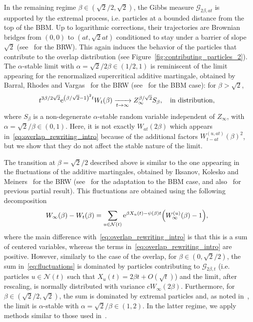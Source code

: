 \documentclass[AHL,Unicode,longabstracts,published]{cedram}
\newcommand{\e}{\mathrm{e}}
\newcommand\1{\mathds{1}}
\newcommand{\cG}{\mathcal{G}}
\newcommand{\cN}{\mathcal{N}}
\let\originalleft\left
\let\originalright\right
\renewcommand{\left}{\mathopen{}\mathclose\bgroup\originalleft}
\renewcommand{\right}{\aftergroup\egroup\originalright}
\renewcommand*{\to}{\mathchoice{\longrightarrow}{\rightarrow}{\rightarrow}{\rightarrow}}
\begin{document}
In the remaining regime $\beta \in (\sqrt{2}/2, \sqrt{2})$, the Gibbs measure $\cG_{2\beta, at}$ is supported by the extremal process, i.e. particles at a bounded distance from the top of the BBM. Up to logarithmic corrections, their trajectories are Brownian bridges from $(0,0)$ to $(at,\sqrt{2}at)$ conditioned to stay under a barrier of slope $\sqrt{2}$ (see~\cite{ChenMadauleMallein2019} for the BRW). This again induces the behavior of the particles that contribute to the overlap distribution (see Figure~\ref{fig:contributing_particles_2}). The $\alpha$-stable limit with $\alpha = \sqrt{2}/2\beta \in (1/2, 1)$ is reminiscent of the limit appearing for the renormalized supercritical additive martingale, obtained by Barral, Rhodes and Vargas~\cite{BarralRhodesVargas2018} for the BRW (see~\cite[Remark~2.7]{Bonnefont2022} for the BBM case): for $\beta > \sqrt{2}$,
\begin{equation}\label{eq:supercritical_W}
t^{3\beta/2\sqrt{2}} \e^{\left(\beta/\sqrt{2}-1\right)^2t} W_t(\beta)
\xrightarrow[t\to\infty]{} Z_\infty^{\beta/\sqrt{2}} S_\beta, \quad \text{in distribution},
\end{equation}
where $S_{\beta}$ is a non-degenerate $\alpha$-stable random variable independent of $Z_\infty$, with $\alpha = \sqrt{2}/\beta \in (0,1)$. Here, it is not exactly $W_{at}(2\beta)$ which appears in~\eqref{eq:overlap_rewriting_intro} because of the additional factors $W_{t - at}^{(u, at)}(\beta)^2$, but we show that they do not affect the stable nature of the limit.


The transition at $\beta = \sqrt{2}/2$ described above is similar to the one appearing in the fluctuations of the additive martingales, obtained by Iksanov, Kolesko and Meiners~\cite{IksanovKoleskoMeiners2020} for the BRW (see~\cite{Chataignier2024} for the adaptation to the BBM case, and also~\cite{HartungKlimovsky2018,IksanovKabluchko2016} for previous partial result). This fluctuations are obtained using the following decomposition
\begin{equation}\label{eq:fluctuations}
W_\infty(\beta) - W_t(\beta) = \sum_{u\in\cN(t)} \e^{\beta X_u(t) - \psi(\beta) t} \left(W_\infty^{(u)}(\beta) - 1\right),
\end{equation}
where the main difference with~\eqref{eq:overlap_rewriting_intro} is that this is a sum of centered variables, whereas the terms in~\eqref{eq:overlap_rewriting_intro} are positive. However, similarly to the case of the overlap, for $\beta \in (0,\sqrt{2}/2)$, the sum in~\eqref{eq:fluctuations} is dominated by particles contributing to $\cG_{2\beta,t}$ (i.e. particles $u\in\cN(t)$ such that $X_u(t) = 2\beta t + O(\sqrt{t})$) and the limit, after rescaling, is normally distributed with variance $c W_\infty(2\beta)$. Furthermore, for $\beta \in (\sqrt{2}/2,\sqrt{2})$, the sum is dominated by extremal particles and, as noted in~\cite{Chataignier2024}, the limit is $\alpha$-stable with $\alpha = \sqrt{2}/\beta \in (1, 2)$. In the latter regime, we apply methods similar to those used in~\cite{IksanovKoleskoMeiners2020}.
\end{document}
